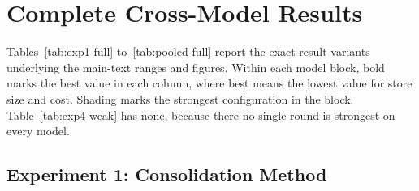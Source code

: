 \section{Complete Cross-Model Results}
\label{app:results}

Tables~\ref{tab:exp1-full} to~\ref{tab:pooled-full} report the exact result
variants underlying the main-text ranges and figures. Within each model
block, bold marks the best value in each column, where best means the lowest
value for store size and cost. Shading marks the strongest configuration in the
block. Table~\ref{tab:exp4-weak} has none, because there no single round is
strongest on every model.

\subsection{Experiment 1: Consolidation Method}

